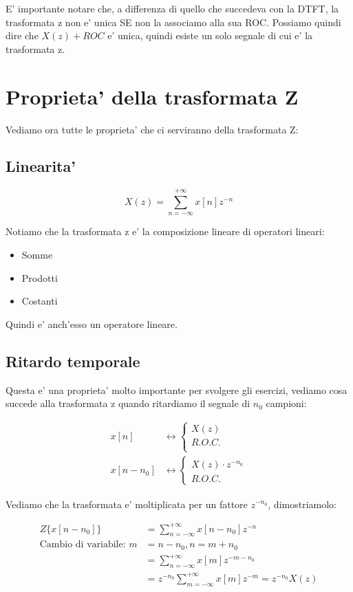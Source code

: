E' importante notare che, a differenza di quello che succedeva con la DTFT, la trasformata z non e' unica SE non la associamo alla sua ROC.
Possiamo quindi dire che $X(z) + ROC$ e' unica, quindi esiste un solo segnale di cui e' la trasformata z.

\section{Proprieta' della trasformata Z}
Vediamo ora tutte le proprieta' che ci serviranno della trasformata Z:

\subsection{Linearita'}

\[
    X(z) = \sum_{n = -\infty}^{+\infty} x[n] z^{-n}
\]

Notiamo che la trasformata z e' la composizione lineare di operatori lineari:
\begin{itemize}
    \item Somme
    \item Prodotti
    \item Costanti
\end{itemize}
Quindi e' anch'esso un operatore lineare.

\subsection{Ritardo temporale}
Questa e' una proprieta' molto importante per svolgere gli esercizi, vediamo cosa succede alla trasformata z quando ritardiamo il segnale di $n_0$ campioni:

\[\begin{split}
    x[n] &\leftrightarrow
    \begin{cases}
    X(z)\\
    R.O.C.\\
    \end{cases}\\
    x[n - n_0] &\leftrightarrow
    \begin{cases}
    X(z) \cdot z^{-n_0}\\
    R.O.C.
    \end{cases}
\end{split}\]

Vediamo che la trasformata e' moltiplicata per un fattore $z^{-n_0}$, dimostriamolo:

\[\begin{split}
    Z\{x[n-n_0]\} &= \sum_{n = -\infty}^{+\infty} x[n-n_0] z^{-n} \\
    \mbox{Cambio di variabile: } m &= n - n_0, n = m + n_0 \\
    &= \sum_{n = -\infty}^{+\infty} x[m] z^{-m -n_0} \\
    &=z^{-n_0} \sum_{m = -\infty}^{+\infty} x[m] z^{-m} = z^{-n_0} X(z)
\end{split}\]

